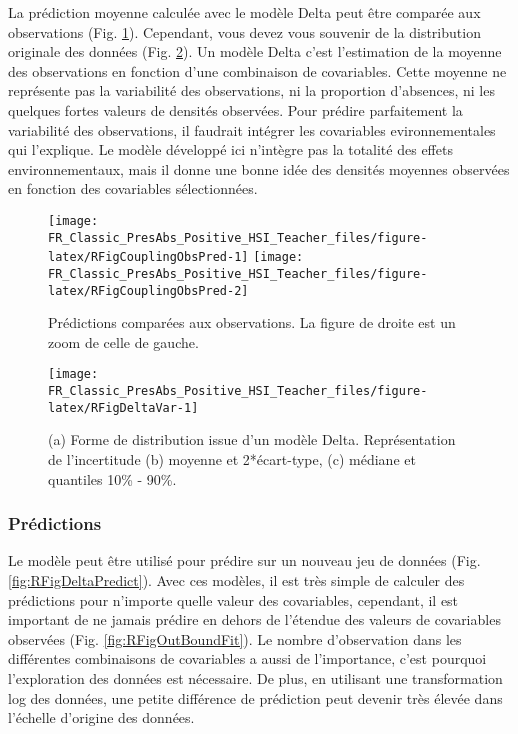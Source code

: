 \documentclass[french,a4paper]{article}
\begin{document}
La prédiction moyenne calculée avec le modèle Delta peut être comparée aux observations (Fig. \ref{fig:RFigCouplingObsPred}). Cependant, vous devez vous souvenir de la distribution originale des données (Fig. \ref{fig:RFigDeltaVar}). Un modèle Delta c'est l'estimation de la moyenne des observations en fonction d'une combinaison de covariables. Cette moyenne ne représente pas la variabilité des observations, ni la proportion d'absences, ni les quelques fortes valeurs de densités observées. Pour prédire parfaitement la variabilité des observations, il faudrait intégrer les covariables evironnementales qui l'explique. Le modèle développé ici n'intègre pas la totalité des effets environnementaux, mais il donne une bonne idée des densités moyennes observées en fonction des covariables sélectionnées.





\begin{figure}[!h]

{\centering \texttt{[image: FR\_Classic\_PresAbs\_Positive\_HSI\_Teacher\_files/figure-latex/RFigCouplingObsPred-1]} \texttt{[image: FR\_Classic\_PresAbs\_Positive\_HSI\_Teacher\_files/figure-latex/RFigCouplingObsPred-2]} 

}

\caption{Prédictions comparées aux observations. La figure de droite est un zoom de celle de gauche.}\label{fig:RFigCouplingObsPred}
\end{figure}

\begin{figure}[!h]

{\centering \texttt{[image: FR\_Classic\_PresAbs\_Positive\_HSI\_Teacher\_files/figure-latex/RFigDeltaVar-1]} 

}

\caption{(a) Forme de distribution issue d'un modèle Delta. Représentation de l'incertitude (b) moyenne et 2*écart-type, (c) médiane et quantiles 10\% - 90\%.}\label{fig:RFigDeltaVar}
\end{figure}

\hypertarget{predictions}{%
\subsubsection{Prédictions}\label{predictions}}

Le modèle peut être utilisé pour prédire sur un nouveau jeu de données (Fig. \ref{fig:RFigDeltaPredict}). Avec ces modèles, il est très simple de calculer des prédictions pour n'importe quelle valeur des covariables, cependant, il est important de ne jamais prédire en dehors de l'étendue des valeurs de covariables observées (Fig. \ref{fig:RFigOutBoundFit}). Le nombre d'observation dans les différentes combinaisons de covariables a aussi de l'importance, c'est pourquoi l'exploration des données est nécessaire. De plus, en utilisant une transformation log des données, une petite différence de prédiction peut devenir très élevée dans l'échelle d'origine des données.
\end{document}
